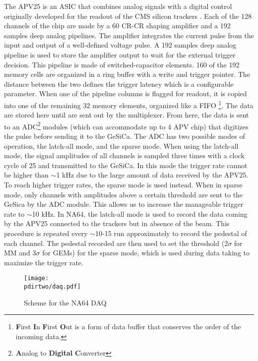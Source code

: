 The APV25 is an ASIC that combines analog signals with a digital control \cite{Bodlak_2013} originally developed for the readout of the CMS silicon trackers \cite{article,inproceedings,apv-useguide}. Each of the 128 channels of the chip are made by a 60 \nas CR-CR shaping amplifier and a 192 samples deep analog pipelines. The amplifier integrates the current pulse from the input and output of a well-defined voltage pulse. A 192 samples deep analog pipeline is used to store the amplifier output to wait for the external trigger decision. This pipeline is made of switched-capacitor elements. 160 of the 192 memory cells are organized in a ring buffer with a write and trigger pointer. The distance between the two defines the trigger latency which is a configurable parameter. When one of the pipeline columns is flagged for readout, it is copied into one of the remaining 32 memory elements, organized like a FIFO \footnote[]{\textbf{F}irst \textbf{I}n \textbf{F}irst \textbf{O}ut is a form of data buffer that conserves the order of the incoming data.}. The data are stored here until are sent out by the multiplexer. From here, the data is sent to an ADC\footnote{\textbf{A}nalog to \textbf{Digital} \textbf{C}onverter} modules (which can accommodate up to 4 APV chip) that digitizes the pulse before sending it to the GeSiCa. The ADC has two possible modes of operation, the latch-all mode, and the sparse mode. When using the latch-all mode, the signal amplitudes of all channels is sampled three times with a clock cycle of 25 \nas and transmitted to the GeSiCa. In this mode the trigger rate cannot be higher than $\sim$1 \si{\kilo\hertz} due to the large amount of data received by the APV25. To reach higher trigger rates, the sparse mode is used instead. When in sparse mode, only channels with amplitudes above a certain threshold are sent to the GeSica by the ADC module. This allows us to increase the manageable trigger rate to $\sim$10 \si{\kilo\hertz}. In NA64, the latch-all mode is used to record the data coming by the APV25 connected to the trackers but in absence of the beam. This procedure is repeated every $\sim$10-15 run approximately to record the pedestal of each channel. The pedestal recorded are then used to set the threshold (2$\sigma$ for MM and 3$\sigma$ for GEMs) for the sparse mode, which is used during data taking to maximize the trigger rate.

\begin{figure}[tbh!]
\centering
\texttt{[image: \\pdirtwo/daq.pdf]}
\caption{Scheme for the NA64 DAQ}
\label{fig:daq}
\end{figure}

